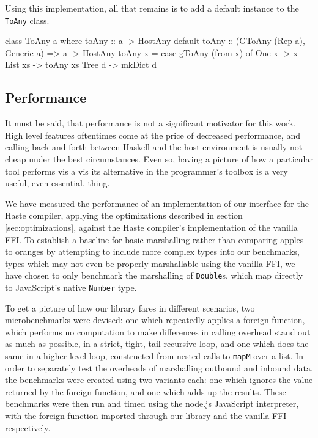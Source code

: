 \documentclass{sigplanconf}
\begin{document}
Using this implementation, all that remains is to add a default instance to
the \lstinline!ToAny! class.

\begin{code}
  class ToAny a where
    toAny :: a -> HostAny
    default toAny :: (GToAny (Rep a), Generic a)
                  => a -> HostAny
    toAny x =
      case gToAny (from x) of
        One x   -> x
        List xs -> toAny xs
        Tree d  -> mkDict d
\end{code}

\subsection{Performance}
\label{sec:performance}
It must be said, that performance is not a significant motivator for this work.
High level features oftentimes come at the price of decreased performance,
and calling back and forth between Haskell and the host environment is usually
not cheap under the best circumstances.
Even so, having a picture of how a particular tool performs vis a vis its
alternative in the programmer's toolbox is a very useful, even essential,
thing.

We have measured the performance of an implementation of our interface for the
Haste compiler, applying the optimizations described in section
\ref{sec:optimizations}, against the Haste compiler's implementation of the
vanilla FFI. To establish a baseline for basic marshalling rather than
comparing apples to oranges by attempting to include more complex types
into our benchmarks, types which may not even be properly marshallable using
the vanilla FFI, we have chosen to only benchmark the marshalling of
\lstinline!Double!s, which map directly to JavaScript's native
\lstinline!Number! type.

To get a picture of how our library fares in different scenarios,
two microbenchmarks were devised: one which repeatedly applies a foreign
function, which performs no computation to make differences in
calling overhead stand out as much as possible, in a strict, tight, tail
recursive loop, and one which does the same in a higher level loop,
constructed from nested calls to \lstinline!mapM! over a list.
In order to separately
test the overheads of marshalling outbound and inbound data, the benchmarks
were created using two variants each: one which ignores the value returned
by the foreign function, and one which adds up the results.
These benchmarks were then run and timed
using the node.js JavaScript interpreter, with the foreign function imported
through our library and the vanilla FFI respectively.
\end{document}
